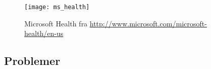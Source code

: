 \begin{figure}
\centering
\texttt{[image: ms\_health]}
\caption{Microsoft Health fra \url{http://www.microsoft.com/microsoft-health/en-us}}
\label{eksisterende_systemer:ms_health_fig}
\end{figure}

\subsection{Problemer}



